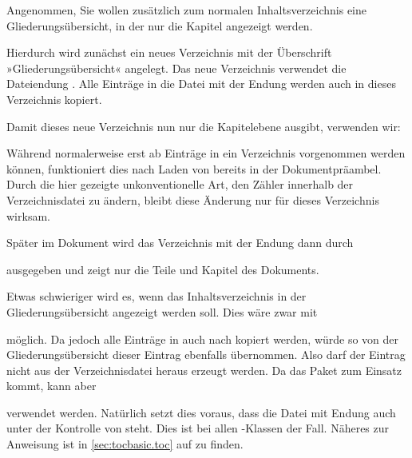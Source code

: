 \begin{Example}
  Angenommen, Sie wollen zusätzlich zum normalen Inhaltsverzeichnis eine
  Gliederungsübersicht, in der nur die Kapitel angezeigt werden.
\begin{lstcode}
  \usepackage{scrwfile}
\end{lstcode}
  Hierdurch wird zunächst ein neues Verzeichnis mit der Überschrift
  »Gliederungsübersicht« angelegt. Das neue Verzeichnis verwendet die
  Dateiendung . Alle Einträge in die Datei mit der Endung
   werden auch in dieses Verzeichnis kopiert.

  Damit dieses neue Verzeichnis nun nur die Kapitelebene ausgibt, verwenden
  wir: 
\begin{lstcode}
\end{lstcode}
  Während normalerweise erst ab
   Einträge in ein Verzeichnis vorgenommen
  werden können, funktioniert dies nach Laden von  bereits
  in der Dokumentpräambel. Durch die hier gezeigte unkonventionelle Art, den
  Zähler  innerhalb der Verzeichnisdatei zu
  ändern, bleibt diese Änderung nur für dieses Verzeichnis wirksam.

  Später im Dokument wird das Verzeichnis mit der Endung  dann
  durch
\begin{lstcode}[moretexcs={listofstoc}]
  \listofstoc
\end{lstcode}
  ausgegeben und zeigt nur die Teile und Kapitel des Dokuments.

  Etwas schwieriger wird es, wenn das Inhaltsverzeichnis in der
  Gliederungsübersicht angezeigt werden soll. Dies wäre zwar mit
\begin{lstcode}
\end{lstcode}
  möglich. Da jedoch alle Einträge in  auch nach  kopiert
  werden, würde so von der Gliederungsübersicht dieser Eintrag ebenfalls
  übernommen. Also darf der Eintrag nicht aus der Verzeichnisdatei heraus
  erzeugt werden. Da das Paket \hyperref[cha:tocbasic]{}%
   zum Einsatz kommt,
  kann aber%
\begin{lstcode}
\end{lstcode}
  verwendet werden. Natürlich setzt dies voraus, dass die
  Datei mit Endung  auch unter der Kontrolle von
  \hyperref[cha:tocbasic]{} steht. Dies ist bei allen
  \KOMAScript-Klassen der Fall. Näheres zur Anweisung
   ist in \autoref{sec:tocbasic.toc}
  auf  zu finden.%
\end{Example}%
